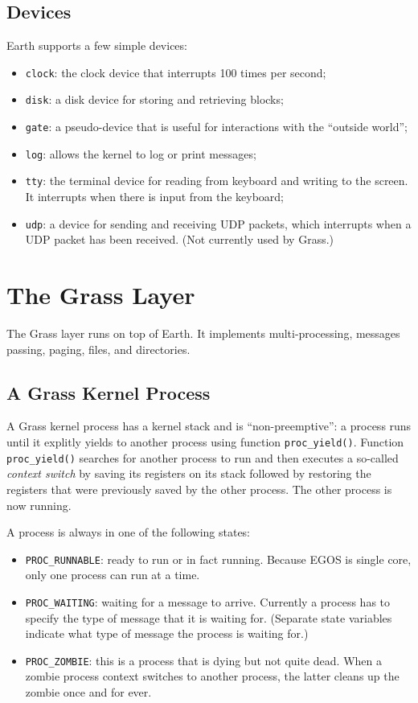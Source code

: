 \documentclass{article}
\begin{document}
\subsection{Devices}

Earth supports a few simple devices:

\begin{itemize}
\item \texttt{clock}: the clock device that interrupts 100 times per second;
\item \texttt{disk}: a disk device for storing and retrieving blocks;
\item \texttt{gate}: a pseudo-device that is useful for interactions with the ``outside world'';
\item \texttt{log}: allows the kernel to log or print messages;
\item \texttt{tty}: the terminal device for reading from keyboard and writing to the screen.  It interrupts when there is input from the keyboard;
\item \texttt{udp}: a device for sending and receiving UDP packets, which
interrupts when a UDP packet has been received.  (Not currently used by Grass.)
\end{itemize}

\section{The Grass Layer}

The Grass layer runs on top of Earth.  It implements multi-processing,
messages passing, paging, files, and directories.

\subsection{A Grass Kernel Process}

A Grass kernel process has a kernel stack and is ``non-preemptive'':
a process runs until it explitly yields
to another process using function \texttt{proc\_yield()}.
Function \texttt{proc\_yield()} searches for another process to run
and then executes a so-called \emph{context switch} by saving its
registers on its stack followed by restoring the registers that were
previously saved by the other process.  The other process is now running.

A process is always in one of the following states:
\begin{itemize}
\item \texttt{PROC\_RUNNABLE}: ready to run or in fact running.  Because EGOS
is single core, only one process can run at a time.
\item \texttt{PROC\_WAITING}: waiting for a message to arrive.  Currently
a process has to specify the type of message that it is waiting for.
(Separate state variables indicate what type of message the process is waiting for.)
\item \texttt{PROC\_ZOMBIE}: this is a process that is dying but not quite
dead.  When a zombie process context switches to another process, the
latter cleans up the zombie once and for ever.
\end{itemize}
\end{document}
